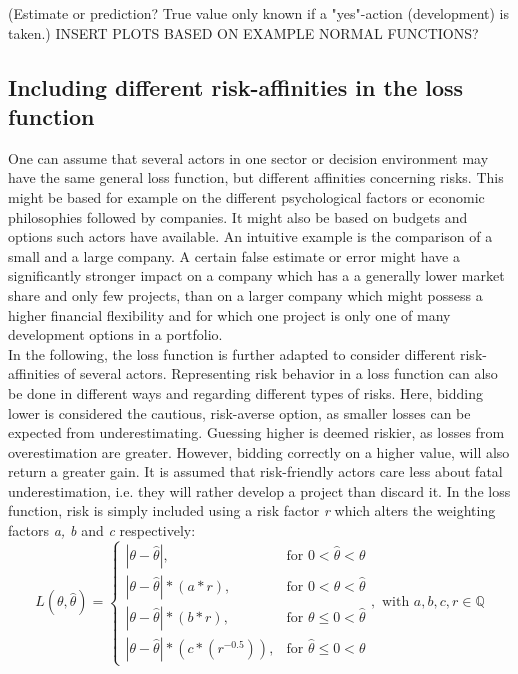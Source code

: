 		(Estimate or prediction? True value only known if a "yes"-action (development) is taken.)
		INSERT PLOTS BASED ON EXAMPLE NORMAL FUNCTIONS?
		
		\subsection{Including different risk-affinities in the loss function}
		
		One can assume that several actors in one sector or decision environment may have the same general loss function, but different affinities concerning risks. This might be based for example on the different psychological factors or economic philosophies followed by companies. It might also be based on budgets and options such actors have available. An intuitive example is the comparison of a small and a large company. A certain false estimate or error might have a significantly stronger impact on a company which has a a generally lower market share and only few projects, than on a larger company which might possess a higher financial flexibility and for which one project is only one of many development options in a portfolio.\\		
		In the following, the loss function is further adapted to consider different risk-affinities of several actors. Representing risk behavior in a loss function can also be done in different ways and regarding different types of risks. Here, bidding lower is considered the cautious, risk-averse option, as smaller losses can be expected from underestimating. Guessing higher is deemed riskier, as losses from overestimation are greater. However, bidding correctly on a higher value, will also return a greater gain. It is assumed that risk-friendly actors care less about fatal underestimation, i.e. they will rather develop a project than discard it. In the loss function, risk is simply included using a risk factor \textit{r} which alters the weighting factors \textit{a, b} and \textit{c} respectively:
		\begin{equation}\label{eq:LFR_final}
		L(\theta,\hat{\theta}) =
		\begin{cases}
		|\theta - \hat{\theta}|, & \text{for } 0<\hat{\theta}<\theta  \\
		|\theta-\hat{\theta}|*(a*r), & \text{for } 0<\theta<\hat{\theta} \\
		|\theta-\hat{\theta}|*(b*r), & \text{for } \theta\leq0<\hat{\theta} \\
		|\theta-\hat{\theta}|*(c*(r^{-0.5})), & \text{for } \hat{\theta}\leq0<\theta 
		\end{cases},
		\text{ with } a,b,c,r \in \mathbb{Q}
		\end{equation}	
